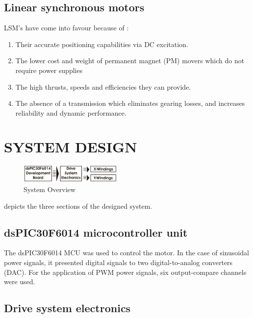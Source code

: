 \documentclass[10pt,twocolumn]{witseiepaper}
\begin{document}
\subsection{Linear synchronous motors}

LSM's have come into favour because of \cite{Halbach-1,XY-Thrust}:
\begin{enumerate}
	\item Their accurate positioning capabilities via DC excitation.
	\item The lower cost and weight of permanent magnet (PM) movers which do not require power supplies
	\item The high thrusts, speeds and efficiencies they can provide.
	\item The absence of a transmission which eliminates gearing losses, and increases reliability and dynamic performance.
\end{enumerate}

\section{SYSTEM DESIGN}

\begin{figure}[ht]
	\centering
		\includegraphics[width=0.45\textwidth]{../../Drawings/Flow-Diagram.pdf}
	\caption{System Overview}
	\label{fig:Sys}
\end{figure}
 depicts the three sections of the designed system.

\subsection{dsPIC30F6014 microcontroller unit}
The dsPIC30F6014 MCU \cite{Microchip} was used to control the motor.  In the
case of sinusoidal power signals, it presented digital signals to two
digital-to-analog converters (DAC).  For the application of PWM power signals,
six output-compare channels were used.
 
\subsection{Drive system electronics}
\end{document}
